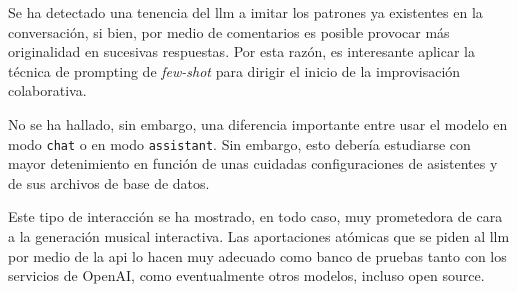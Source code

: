Se ha detectado una tenencia del \gls{llm} a imitar los patrones ya existentes en la conversación, si bien, por medio de comentarios es posible provocar más originalidad en sucesivas respuestas. Por esta razón, es interesante aplicar la técnica de prompting de \emph{few-shot} para dirigir el inicio de la improvisación colaborativa. 

No se ha hallado, sin embargo, una diferencia importante entre usar el modelo en modo \texttt{chat} o en modo \texttt{assistant}. Sin embargo, esto debería estudiarse con mayor detenimiento en función de unas cuidadas configuraciones de asistentes y de sus archivos de base de datos.

Este tipo de interacción se ha mostrado, en todo caso, muy prometedora de cara a la generación musical interactiva. Las aportaciones atómicas que se piden al \gls{llm} por medio de la \gls{api} lo hacen muy adecuado como banco de pruebas tanto con los servicios de OpenAI, como eventualmente otros modelos, incluso open source.

